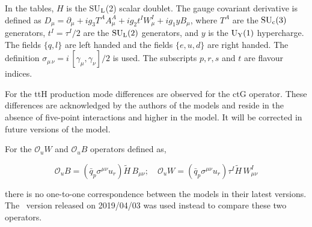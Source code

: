 In the tables, $H$ is the SU$_{\textrm L}$(2) scalar doublet. The gauge covariant derivative is defined as  $D_\mu = \partial_\mu + i g_3 T^A A^A_\mu + i g_2  t^I W^I_\mu + i g_1 y B_\mu$, where $T^A$ are the $\rm SU_c(3)$ generators, $t^I=\tau^I/2$ are the $\rm SU_L(2)$ generators, and $y$ is the $\rm U_Y(1)$ hypercharge. The fields $\{q,l \}$ are left handed and the fields $\{e,u,d\}$ are right handed. The definition $\sigma_{\mu \, \nu} = i \, [\gamma_\mu,\gamma_\nu]/2$ is used. The subscripts $p,r,s$ and $t$ are flavour indices.

For the ttH production mode differences are observed for the ctG operator. These differences are acknowledged by the authors of the models and reside in the absence of five-point interactions and higher in the \SMEFTsim model. It will be corrected in future versions of the model.

For the $\mathcal{O}_uW$ and $\mathcal{O}_uB$ operators defined as,

$$ \mathcal{O}_uB = (\bar q_p \sigma^{\mu\nu} u_r) \widetilde H \, B_{\mu\nu}; \quad
   \mathcal{O}_uW =  (\bar q_p \sigma^{\mu\nu} u_r) \tau^I \widetilde H \, W_{\mu\nu}^I
$$

   there is no one-to-one correspondence between the models in their latest versions. The \SMEFTatNLO\ version released on 2019/04/03 was used instead to compare these two operators.

\begin{center}
  \begin{table}[h]
    \caption{ Comparison of the SM and interference predicitions for the ttH process between the \SMEFTsim\ and \SMEFTatNLO\ for |cuB| (ctB) and |cuW| (ctW). The operator definition are given in the way they are implemented in \SMEFTsim\ .}
    \label{tab:higgseft:comptth2}
\end{table}
\end{center}

